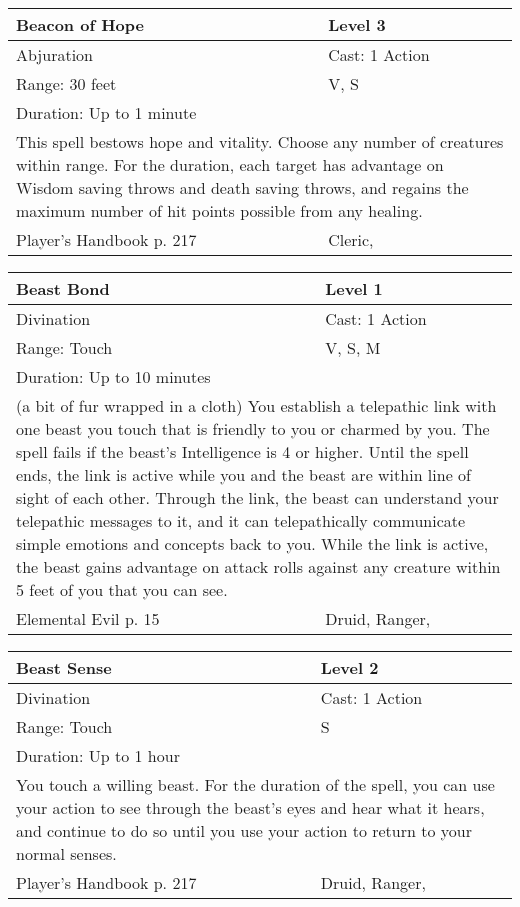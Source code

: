 \documentclass[11pt]{report}
\begin{document}
\begin{table}[H]
	\begin{tabular}{||p{6cm}|p{6cm}||}
		\hline\hline
		\bf{Beacon of Hope} & Level 3\\ \hline
		Abjuration & Cast: 1 Action\\ \hline
		Range: 30 feet & V, S\\ \hline
		Duration: Up to 1 minute & \\ \hline
		\multicolumn{2}{||p{12cm}||}{This spell bestows hope and vitality. Choose any number of creatures within range. For the duration, each target has advantage on Wisdom saving throws and death saving throws, and regains the maximum number of hit points possible from any healing.}\\ \hline
Player's Handbook p. 217 & Cleric, \\ \hline\hline
	\end{tabular}
\end{table}

\begin{table}[H]
	\begin{tabular}{||p{6cm}|p{6cm}||}
		\hline\hline
		\bf{Beast Bond} & Level 1\\ \hline
		Divination & Cast: 1 Action\\ \hline
		Range: Touch & V, S, M\\ \hline
		Duration: Up to 10 minutes & \\ \hline
		\multicolumn{2}{||p{12cm}||}{(a bit of fur wrapped in a cloth)
You establish a telepathic link with one beast you touch that is friendly to you or charmed by you. The spell
fails if the beast’s Intelligence is 4 or higher. Until the spell ends, the link is active while you and the beast are within line of sight of each other. Through the link, the beast can understand your telepathic messages to it, and it can telepathically communicate simple emotions and concepts back to you. While the link is active,
the beast gains advantage on attack rolls against any creature within 5 feet of you that you can see.}\\ \hline
Elemental Evil p. 15 & Druid, Ranger, \\ \hline\hline
	\end{tabular}
\end{table}

\begin{table}[H]
	\begin{tabular}{||p{6cm}|p{6cm}||}
		\hline\hline
		\bf{Beast Sense} & Level 2\\ \hline
		Divination & Cast: 1 Action\\ \hline
		Range: Touch & S\\ \hline
		Duration: Up to 1 hour & \\ \hline
		\multicolumn{2}{||p{12cm}||}{You touch a willing beast. For the duration of the spell, you can use your action to see through the beast’s eyes and hear what it hears, and continue to do so until you use your action to return to your normal senses.}\\ \hline
Player's Handbook p. 217 & Druid, Ranger, \\ \hline\hline
	\end{tabular}
\end{table}
\end{document}
